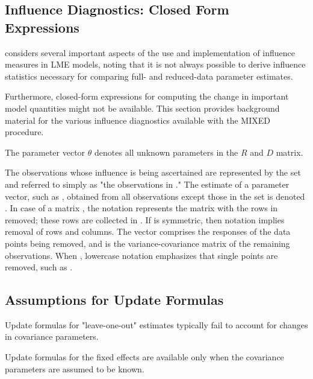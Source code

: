 \documentclass[12pt, a4paper]{report}
\theoremstyle{plain}
\theoremstyle{definition}
\theoremstyle{remark}
\begin{document}
	
	
	

\subsection{Influence Diagnostics: Closed Form Expressions} %

\citet{schabenberger} considers several important aspects of the use and implementation of influence measures in LME models, noting that it is not always possible to
derive influence statistics necessary for comparing full- and reduced-data parameter estimates. 




Furthermore, closed-form expressions for computing the change in important model quantities might not be available.
This section provides background material for the various influence diagnostics available with the MIXED procedure.

The parameter vector $\theta$ denotes all unknown parameters in the  $R$ and $D$  matrix.

The observations whose influence is being ascertained are represented by the set  and referred to simply as "the observations in ." The estimate of a parameter vector, such as , obtained from all observations except those in the set  is denoted . In case of a matrix , the notation  represents the matrix with the rows in  removed; these rows are collected in .
If  is symmetric, then notation  implies removal of rows and columns. The vector  comprises the responses of the data points being removed, and  is the variance-covariance matrix of the remaining observations. When , lowercase notation emphasizes that single points are removed, such as .



\subsection*{Assumptions for Update Formulas}
Update formulas for "leave-one-out" estimates typically fail to account for changes in covariance parameters.

Update formulas for the fixed effects are available only when the covariance parameters are assumed to be known. 
\end{document}

